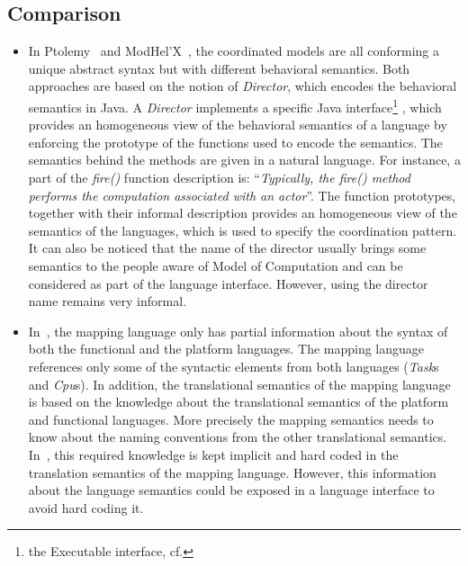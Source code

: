 	\subsection{Comparison}
		\begin{itemize}
		
			
			\item In Ptolemy~\cite{ptolemybib} and ModHel'X~\cite{modhelxbib}, the coordinated models are all conforming a unique abstract syntax but with different behavioral semantics. Both approaches are based on the notion of \emph{Director}, which encodes the behavioral semantics in Java. A \emph{Director} implements a specific Java interface\footnote{the Executable interface, cf.} %
			, which provides an homogeneous view of the behavioral semantics of a language by enforcing the prototype of the functions used to encode the semantics. The semantics behind the methods are given in a natural language. For instance, a part of the \emph{fire()} function description is: ``\emph{Typically, the fire() method performs the computation associated with an actor}''. The function prototypes, together with their informal description provides an homogeneous view of the semantics of the languages, which is used to specify the coordination pattern. It can also be noticed that the name of the director usually brings some semantics to the people aware of Model of Computation and can be considered as part of the language interface. However, using the director name remains very informal.
			
			\item In~\cite{dinatale}, the mapping language only has partial information about the syntax of both the functional and the platform languages. The mapping language references only some of the syntactic elements from both languages (\eg \emph{Task}s and \emph{Cpu}s). In addition, the translational semantics of the mapping language is based on the knowledge about the translational semantics of the platform and functional languages. More precisely the mapping semantics needs to know about the naming conventions from the other translational semantics. In~\cite{dinatale}, this required knowledge is kept implicit and hard coded in the translation semantics of the mapping language. However, this information about the language semantics could be exposed in a language interface to avoid hard coding it. 
			

\end{itemize}
